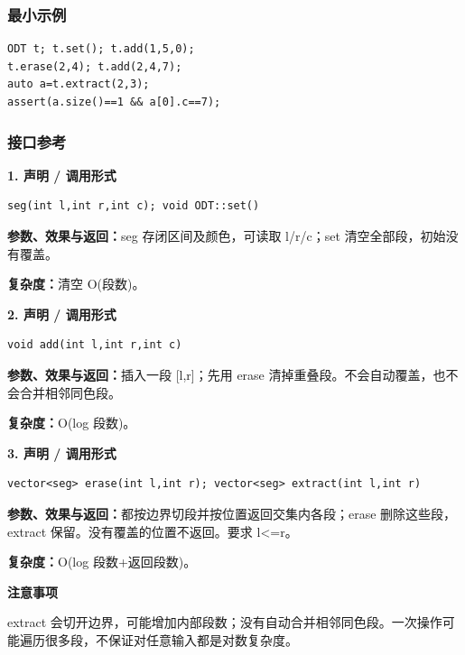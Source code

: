 \documentclass[UTF8,a4paper,10pt]{ctexart}
\newcommand{\TemplNote}[1]{\textbf{注意事项}\par #1\par}
\begin{document}
\subsubsection*{最小示例}
\begin{lstlisting}
ODT t; t.set(); t.add(1,5,0);
t.erase(2,4); t.add(2,4,7);
auto a=t.extract(2,3);
assert(a.size()==1 && a[0].c==7);
\end{lstlisting}
\subsubsection*{接口参考}
\noindent\begin{minipage}{\textwidth}
\textbf{1. 声明 / 调用形式}
\begin{lstlisting}
seg(int l,int r,int c); void ODT::set()
\end{lstlisting}
\textbf{参数、效果与返回：}seg 存闭区间及颜色，可读取 l/r/c；set 清空全部段，初始没有覆盖。

\textbf{复杂度：}清空 O(段数)。

\end{minipage}\par\vspace{0.4em}
\noindent\begin{minipage}{\textwidth}
\textbf{2. 声明 / 调用形式}
\begin{lstlisting}
void add(int l,int r,int c)
\end{lstlisting}
\textbf{参数、效果与返回：}插入一段 [l,r]；先用 erase 清掉重叠段。不会自动覆盖，也不会合并相邻同色段。

\textbf{复杂度：}O(log 段数)。

\end{minipage}\par\vspace{0.4em}
\noindent\begin{minipage}{\textwidth}
\textbf{3. 声明 / 调用形式}
\begin{lstlisting}
vector<seg> erase(int l,int r); vector<seg> extract(int l,int r)
\end{lstlisting}
\textbf{参数、效果与返回：}都按边界切段并按位置返回交集内各段；erase 删除这些段，extract 保留。没有覆盖的位置不返回。要求 l<=r。

\textbf{复杂度：}O(log 段数+返回段数)。

\TemplNote{extract 会切开边界，可能增加内部段数；没有自动合并相邻同色段。一次操作可能遍历很多段，不保证对任意输入都是对数复杂度。}
\end{minipage}\par\vspace{0.4em}
\clearpage
\end{document}
